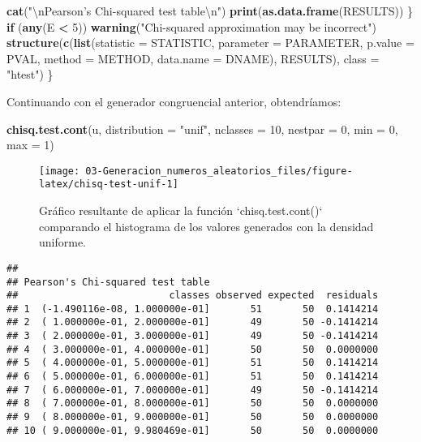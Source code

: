 \documentclass[
]{book}
\newenvironment{Shaded}{\begin{snugshade}}{\end{snugshade}}
\newcommand{\CharTok}[1]{\textcolor[rgb]{0.31,0.60,0.02}{#1}}
\newcommand{\ControlFlowTok}[1]{\textcolor[rgb]{0.13,0.29,0.53}{\textbf{#1}}}
\newcommand{\DataTypeTok}[1]{\textcolor[rgb]{0.13,0.29,0.53}{#1}}
\newcommand{\DecValTok}[1]{\textcolor[rgb]{0.00,0.00,0.81}{#1}}
\newcommand{\KeywordTok}[1]{\textcolor[rgb]{0.13,0.29,0.53}{\textbf{#1}}}
\newcommand{\NormalTok}[1]{#1}
\newcommand{\OperatorTok}[1]{\textcolor[rgb]{0.81,0.36,0.00}{\textbf{#1}}}
\newcommand{\StringTok}[1]{\textcolor[rgb]{0.31,0.60,0.02}{#1}}
\theoremstyle{break}
\theoremstyle{definition}
\theoremstyle{definition}
\theoremstyle{definition}
\theoremstyle{remark}
\begin{document}
\begin{Shaded}
\begin{Highlighting}[]
        \KeywordTok{cat}\NormalTok{(}\StringTok{"}\CharTok{\textbackslash{}n}\StringTok{Pearson's Chi-squared test table}\CharTok{\textbackslash{}n}\StringTok{"}\NormalTok{)}
        \KeywordTok{print}\NormalTok{(}\KeywordTok{as.data.frame}\NormalTok{(RESULTS))}
\NormalTok{    \}}
    \ControlFlowTok{if}\NormalTok{ (}\KeywordTok{any}\NormalTok{(E }\OperatorTok{<}\StringTok{ }\DecValTok{5}\NormalTok{)) }
        \KeywordTok{warning}\NormalTok{(}\StringTok{"Chi-squared approximation may be incorrect"}\NormalTok{)}
    \KeywordTok{structure}\NormalTok{(}\KeywordTok{c}\NormalTok{(}\KeywordTok{list}\NormalTok{(}\DataTypeTok{statistic =}\NormalTok{ STATISTIC, }\DataTypeTok{parameter =}\NormalTok{ PARAMETER, }\DataTypeTok{p.value =}\NormalTok{ PVAL, }
        \DataTypeTok{method =}\NormalTok{ METHOD, }\DataTypeTok{data.name =}\NormalTok{ DNAME), RESULTS), }\DataTypeTok{class =} \StringTok{"htest"}\NormalTok{)}
\NormalTok{\}}
\end{Highlighting}
\end{Shaded}

Continuando con el generador congruencial anterior, obtendríamos:

\begin{Shaded}
\begin{Highlighting}[]
\KeywordTok{chisq.test.cont}\NormalTok{(u, }\DataTypeTok{distribution =} \StringTok{"unif"}\NormalTok{, }
                \DataTypeTok{nclasses =} \DecValTok{10}\NormalTok{, }\DataTypeTok{nestpar =} \DecValTok{0}\NormalTok{, }\DataTypeTok{min =} \DecValTok{0}\NormalTok{, }\DataTypeTok{max =} \DecValTok{1}\NormalTok{)}
\end{Highlighting}
\end{Shaded}

\begin{figure}[!htb]

{\centering \texttt{[image: 03-Generacion\_numeros\_aleatorios\_files/figure-latex/chisq-test-unif-1]} 

}

\caption{Gráfico resultante de aplicar la función `chisq.test.cont()` comparando el histograma de los valores generados con la densidad uniforme.}\label{fig:chisq-test-unif}
\end{figure}

\begin{verbatim}
## 
## Pearson's Chi-squared test table
##                          classes observed expected  residuals
## 1  (-1.490116e-08, 1.000000e-01]       51       50  0.1414214
## 2  ( 1.000000e-01, 2.000000e-01]       49       50 -0.1414214
## 3  ( 2.000000e-01, 3.000000e-01]       49       50 -0.1414214
## 4  ( 3.000000e-01, 4.000000e-01]       50       50  0.0000000
## 5  ( 4.000000e-01, 5.000000e-01]       51       50  0.1414214
## 6  ( 5.000000e-01, 6.000000e-01]       51       50  0.1414214
## 7  ( 6.000000e-01, 7.000000e-01]       49       50 -0.1414214
## 8  ( 7.000000e-01, 8.000000e-01]       50       50  0.0000000
## 9  ( 8.000000e-01, 9.000000e-01]       50       50  0.0000000
## 10 ( 9.000000e-01, 9.980469e-01]       50       50  0.0000000
\end{verbatim}
\end{document}
